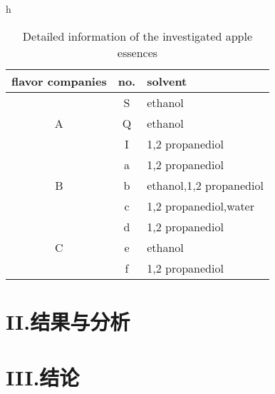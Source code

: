 \documentclass[a4paper]{article}
\begin{document}
\begin{table}{h} %
  \centering
  \caption{Detailed information of the investigated apple essences}\label{a}
  \begin{tabular}{c|c|l}

     \hline
     flavor companies       & no.       & solvent \\
     \hline
     \multirow{3}{*}{A}       & S         & ethanol \\
     \cline{2-3}
                              & Q         & ethanol \\
     \cline{2-3}
                              & I         & 1,2 propanediol \\
     \hline
     \multirow{3}{*}{B}       & a         & 1,2 propanediol \\
     \cline{2-3}
                              & b         & ethanol,1,2 propanediol \\
     \cline{2-3}
                              & c         & 1,2 propanediol,water \\
     \hline
     \multirow{3}{*}{C}       & d         & 1,2 propanediol \\
     \cline{2-3}
                              & e         & ethanol \\
     \cline{2-3}
                              & f         & 1,2 propanediol \\
     \hline
   \end{tabular}

\end{table}

\section{II.结果与分析}

\section{III.结论}
\end{document}
